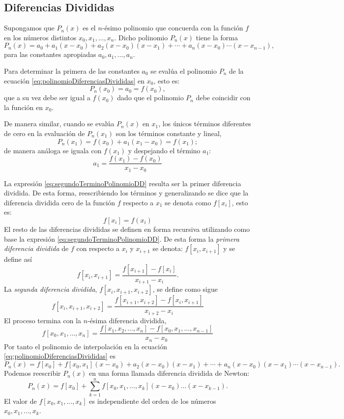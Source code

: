 \subsection{Diferencias Divididas}

Supongamos que $P_n(x)$ es el $n$-ésimo polinomio que concuerda con la función $f$ en los números distintos $x_0, x_1, \dots , x_n$. Dicho
polinomio $P_n(x)$ tiene la forma 
\begin{equation}
	P_n(x) = a_0 + a_1(x-x_0) + a_2(x-x_0)(x-x_1) + \cdots + a_n(x-x_0)\cdots (x-x_{n-1}),
	\label{eq:polinomioDiferenciasDivididas}
\end{equation}
para las constantes apropiadas $a_0, a_1, \dots ,a_n$. 

Para determinar la primera de las constantes $a_0$ se evalúa el polinomio $P_n$ de la ecuación \ref{eq:polinomioDiferenciasDivididas} en $x_0$, esto es:
$$P_n(x_0) = a_0 = f(x_0),$$
que a su vez debe ser igual a $f(x_0)$ dado que el polinomio $P_n$ debe coincidir con la función en $x_0$.

De manera similar, cuando se evalúa $P_n(x)$ en $x_1$, los únicos términos diferentes de cero en la evaluación de $P_n(x_1)$ son los términos 
constante y lineal,
$$P_n(x_1) = f(x_0) + a_1(x_1-x_0) = f(x_1);$$ 
de manera análoga se iguala con $f(x_1)$ y despejando el término $a_1$:
\begin{equation}
	a_1 = \dfrac{f(x_1) - f(x_0)}{x_1 - x_0}
	\label{eq:segundoTerminoPolinomioDD}
\end{equation}

La expresión \ref{eq:segundoTerminoPolinomioDD} resulta ser la primer diferencia dividida.
De esta forma, reescribiendo los términos y generalizando se dice que la diferencia dividida cero de la función $f$ respecto a $x_1$  se denota como $f[x_i]$, 
esto es:
$$f[x_i] = f(x_i)$$
El resto de las diferencias divididas se definen en forma recursiva utilizando como base la expresión \ref{eq:segundoTerminoPolinomioDD}. De esta forma 
la \textit{primera diferencia dividida} de $f$ con respecto a $x_i$ y $x_{i+1}$ se denota:
$f[x_i, x_{i+1}]$ y se define así
\begin{equation}
	f[x_i, x_{i+1}] = \dfrac{f[x_{i+1}] - f[x_i]}{x_{i+1} - x_i}.
	\label{eq:primeraDiferenciaDividida}
\end{equation}
La \textit{segunda diferencia dividida}, $f[x_i, x_{i+1}, x_{i+2}]$, se define como sigue
$$f[x_i, x_{i+1}, x_{i+2}] = \dfrac{f[x_{i+1}, x_{i+2}] - f[x_i, x_{i+1}]}{x_{i+2} - x_i}$$
El proceso termina con la $n$-ésima diferencia dividida,
$$f[x_0, x_1, \dots, x_n] = \dfrac{f[x_1, x_2, \dots , x_n] - f[x_0, x_1, \dots, x_{n-1}]}{x_n - x_0}$$
Por tanto el polinomio de interpolación en la ecuación \ref{eq:polinomioDiferenciasDivididas} es
$$P_n(x) = f[x_0] + f[x_0, x_1](x-x_0) + a_2(x-x_0)(x-x_1) + \cdots + a_n(x-x_0)(x-x_1)\cdots (x-x_{n-1}).$$
Podemos reescribir $P_n(x)$ en una forma llamada diferencia dividida de Newton:
\begin{equation}
	P_n(x) = f[x_0] + \sum_{k=1}^n f[x_0, x_1, \dots , x_k](x-x_0)\dots (x-x_{k-1}).
	\label{eq:diferenciaDivididaNewton}
\end{equation}
El valor de $f[x_0, x_1, \dots, x_k]$ es independiente del orden de los números $x_0, x_1, \dots, x_k$.


